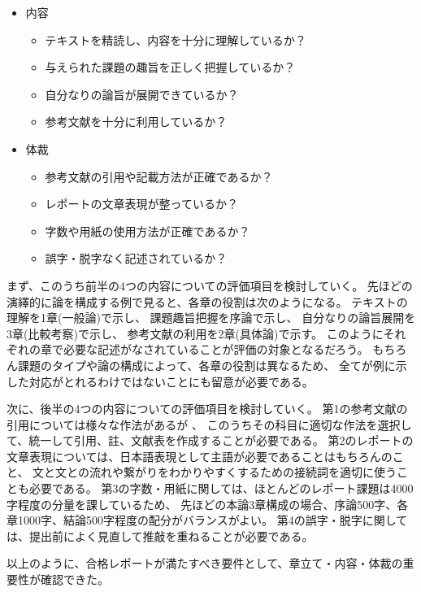 \documentclass[11pt,a4paper,uplatex]{jsarticle}
\renewcommand{\footnote}{\endnote} %
\def\tightlist{}
\begin{document}
\begin{itemize}
\tightlist
\item
  内容

  \begin{itemize}
  \tightlist
  \item
    テキストを精読し、内容を十分に理解しているか？
  \item
    与えられた課題の趣旨を正しく把握しているか？
  \item
    自分なりの論旨が展開できているか？
  \item
    参考文献を十分に利用しているか？
  \end{itemize}
\item
  体裁

  \begin{itemize}
  \tightlist
  \item
    参考文献の引用や記載方法が正確であるか？
  \item
    レポートの文章表現が整っているか？
  \item
    字数や用紙の使用方法が正確であるか？
  \item
    誤字・脱字なく記述されているか？
  \end{itemize}
\end{itemize}

まず、このうち前半の4つの内容についての評価項目を検討していく。
先ほどの演繹的に論を構成する例で見ると、各章の役割は次のようになる。
テキストの理解を1章(一般論)で示し、 課題趣旨把握を序論で示し、
自分なりの論旨展開を3章(比較考察)で示し、
参考文献の利用を2章(具体論)で示す。
このようにそれぞれの章で必要な記述がなされていることが評価の対象となるだろう。
もちろん課題のタイプや論の構成によって、各章の役割は異なるため、
全てが例に示した対応がとれるわけではないことにも留意が必要である。

次に、後半の4つの内容についての評価項目を検討していく。
第1の参考文献の引用については様々な作法があるが \footnote{\citet{kawano2018},
  p.72-96} \footnote{\citet{sako2012}, p.91-108}、
このうちその科目に適切な作法を選択して、統一して引用、註、文献表を作成することが必要である。
第2のレポートの文章表現については、日本語表現として主語が必要であることはもちろんのこと、
文と文との流れや繋がりをわかりやすくするための接続詞を適切に使うことも必要である。
第3の字数・用紙に関しては、ほとんどのレポート課題は4000字程度の分量を課しているため、
先ほどの本論3章構成の場合、序論500字、各章1000字、結論500字程度の配分がバランスがよい。
第4の誤字・脱字に関しては、提出前によく見直して推敲を重ねることが必要である。

以上のように、合格レポートが満たすべき要件として、章立て・内容・体裁の重要性が確認できた。
\end{document}
